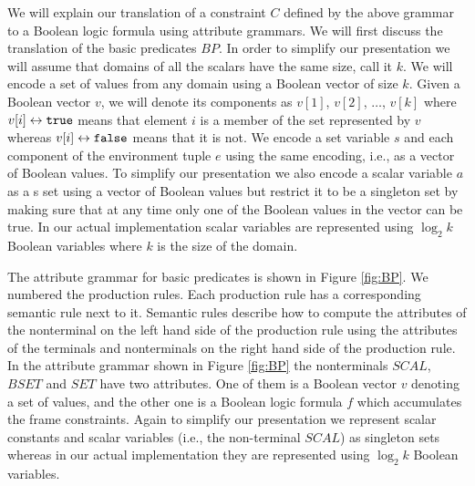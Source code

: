 We will explain our translation of a constraint $C$ defined by the
above grammar to a Boolean logic formula using attribute grammars.
We will first discuss the translation of the 
basic predicates $BP$.
In order to simplify our presentation we will assume that 
domains of all the scalars have the same size, call it $k$. We will encode a set
of values from any domain using a Boolean vector of size $k$.
Given a Boolean vector $v$, we will denote its components
as $v[1]$, $v[2]$, $\dots$, $v[k]$ where $v[i] \leftrightarrow \texttt{true}$ means
that element $i$ is a member of the set represented by $v$
whereas $v[i] \leftrightarrow \texttt{false}$ means that it is not.
We encode a set variable $s$ and each component of the
environment tuple $e$ using the same encoding, i.e., as a vector
of Boolean values.
To simplify our presentation we
also encode a scalar variable $a$ as a s set using a vector of Boolean values
but restrict it to be a singleton set by making sure that at any time
only one of the Boolean values in the vector can be true.
In our actual implementation scalar variables are represented
using $\log_2 k$ Boolean variables where $k$ is the size of the domain.

The attribute grammar for basic predicates is shown in 
Figure \ref{fig:BP}.
We numbered the production rules. Each production rule has a corresponding
semantic rule next to it. Semantic rules
describe how to compute the attributes of the nonterminal on the
left hand side of the production rule using the attributes
of the terminals and nonterminals on the right 
hand side of the production rule. 
In the attribute grammar shown in Figure \ref{fig:BP}
the nonterminals $SCAL$, $BSET$
and $SET$ have two attributes. One of them is a Boolean vector $v$
denoting a set of values, and the other one is a Boolean logic formula
$f$ which accumulates the frame constraints.
Again to simplify our presentation we represent scalar constants and
scalar variables (i.e., the non-terminal $SCAL$) as singleton sets
whereas in our actual implementation they are  represented
using $\log_2 k$ Boolean variables.

